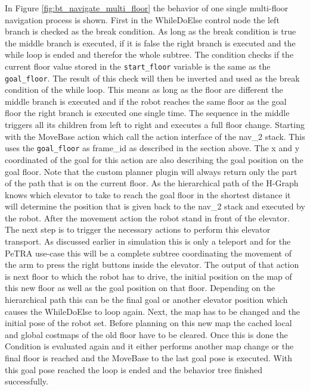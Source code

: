 In Figure \ref{fig:bt_navigate_multi_floor} the behavior of one single multi-floor navigation process is shown. First in the WhileDoElse control node the left branch is checked as the break condition. As long as the break condition is true the middle branch is executed, if it is false the right branch is executed and the while loop is ended and therefor the whole subtree. The condition checks if the current floor value stored in the \texttt{start\_floor} variable is the same as the \texttt{goal\_floor}. The result of this check will then be inverted and used as the break condition of the while loop. This means as long as the floor are different the middle branch is executed and if the robot reaches the same floor as the goal floor the right branch is executed one single time. The sequence in the middle triggers all its children from left to right and executes a full floor change. Starting with the MoveBase action which call the action interface of the \gls{nav_2} stack. This uses the \texttt{goal\_floor} as frame\_id as described in the section above. The x and y coordinated of the goal for this action are also describing the goal position on the goal floor. Note that the custom planner plugin will always return only the part of the path that is on the current floor. As the hierarchical path of the H-Graph knows which elevator to take to reach the goal floor in the shortest distance it will determine the position that is given back to the \gls{nav_2} stack and executed by the robot. After the movement action the robot stand in front of the elevator. The next step is to trigger the necessary actions to perform this elevator transport. As discussed earlier in simulation this is only a teleport and for the PeTRA use-case this will be a complete subtree coordinating the movement of the arm to press the right buttons inside the elevator. The output of that action is next floor to which the robot has to drive, the initial position on the map of this new floor as well as the goal position on that floor. Depending on the hierarchical path this can be the final goal or another elevator position which causes the WhileDoElse to loop again. Next, the map has to be changed and the initial pose of the robot set. Before planning on this new map the cached local and global costmaps of the old floor have to be cleared. Once this is done the Condition is evaluated again and it either performs another map change or the final floor is reached and the MoveBase to the last goal pose is executed. With this goal pose reached the loop is ended and the behavior tree finished successfully.